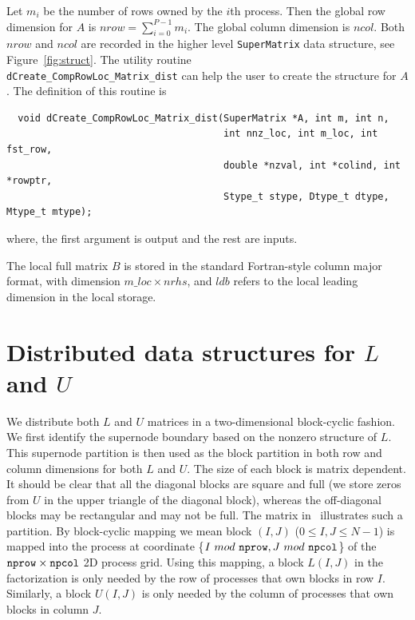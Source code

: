 Let $m_i$ be the number of rows owned by the $i$th process.
Then the global row dimension for $A$ is $nrow = \sum_{i=0}^{P-1}m_i$.
The global column dimension is $ncol$. Both $nrow$ and $ncol$
are recorded in the higher level {\tt SuperMatrix} data structure,
see Figure~\ref{fig:struct}.
The utility routine \\
{\tt dCreate\_CompRowLoc\_Matrix\_dist}
can help the user to create the structure for $A$.
The definition of this routine is
\begin{verbatim}
  void dCreate_CompRowLoc_Matrix_dist(SuperMatrix *A, int m, int n,
                                      int nnz_loc, int m_loc, int fst_row,
                                      double *nzval, int *colind, int *rowptr,
                                      Stype_t stype, Dtype_t dtype, Mtype_t mtype);
\end{verbatim}
where, the first argument is output and the rest are inputs.

The local full matrix $B$ is stored in the standard Fortran-style column
major format, with dimension $m\_loc\times nrhs$, and $ldb$ refers to
the local leading dimension in the local storage.


\section{Distributed data structures for $L$ and $U$}
\label{sec:datastruct}
We distribute both $L$ and $U$ matrices in a two-dimensional
block-cyclic fashion.
We first identify the supernode boundary based on the nonzero structure
of $L$. This supernode partition is then used as the block
partition in both row and column dimensions for both $L$ and $U$.
The size of each block is matrix dependent.
It should be clear that all the diagonal
blocks are square and full (we store zeros from $U$ in the upper triangle
of the diagonal block), whereas the off-diagonal blocks may be
rectangular and may not be full.
The matrix in~ illustrates such a partition.
By block-cyclic mapping we mean block $(I,J)$ ($0\le I, J\le N-1$) is
mapped into the process at coordinate
\{$I\ mod\ {\tt nprow}, J\ mod\ {\tt npcol}$\}
of the ${\tt nprow}\times {\tt npcol}$ 2D process grid.
Using this mapping, a block $L(I,J)$ in the factorization is only needed
by the row of processes that own blocks in row $I$.
Similarly, a block $U(I,J)$ is only needed
by the column of processes that own blocks in column $J$.

